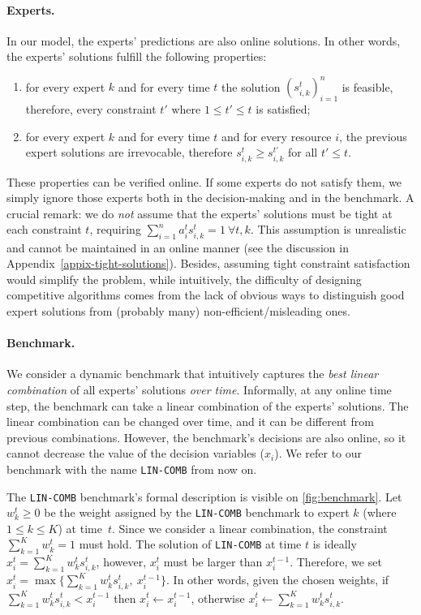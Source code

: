 \paragraph{Experts.} In our model, the experts' predictions are also online solutions. In other words, the experts' solutions
fulfill the following properties:
\begin{enumerate}
	\item for every expert $k$ and for every time $t$ the solution $(s_{i,k}^{t})_{i=1}^{n}$ is feasible, therefore, every constraint $t'$ where $1 \leq t' \leq t$ is satisfied;
	\item for every expert $k$ and for every time $t$ and for every resource $i$, the previous expert solutions are irrevocable, therefore $s_{i,k}^{t} \geq s_{i,k}^{t'}$ for all $t' \leq t$.
\end{enumerate}
These properties can be verified online. If some experts do not satisfy them, we simply ignore those experts both in the decision-making and in the benchmark.
A crucial remark: we do \emph{not} assume that the experts' solutions must be tight at each constraint $t$, requiring $\sum_{i=1}^{n} a_{i}^{t} s_{i,k}^{t} = 1 ~ \forall t, k$.
This assumption is unrealistic and cannot be maintained in an online manner (see the discussion in Appendix~\ref{appix-tight-solutions}).
Besides, assuming tight constraint satisfaction would simplify the problem, while intuitively,
the difficulty of designing competitive algorithms comes from the lack of obvious ways to distinguish
good expert solutions from (probably many) non-efficient/misleading ones.

\paragraph{Benchmark.}
We consider a dynamic benchmark that intuitively captures the \emph{best linear combination} of all experts' solutions \emph{over time}.
Informally, at any online time step, the benchmark can take a linear combination of the experts' solutions.
The linear combination can be changed over time, and it can be different from previous combinations.
However, the benchmark's decisions are also online, so it cannot decrease the value of the decision variables ($x_{i}$).
We refer to our benchmark with the name \texttt{LIN-COMB} from now on.

The \texttt{LIN-COMB} benchmark's formal description is visible on \cref{fig:benchmark}.
Let $w_{k}^{t} \geq 0$ be the weight assigned by the \texttt{LIN-COMB} benchmark to expert $k$ (where $1 \leq k \leq K$) at time~$t$.
Since we consider a linear combination, the constraint $ \sum_{k=1}^{K} w_{k}^{t} = 1$ must hold.
The solution of \texttt{LIN-COMB} at time $t$ is ideally $x_{i}^{t} = \sum_{k=1}^{K} w_{k}^{t} s_{i,k}^{t}$,
however, $x_{i}^{t}$ must be larger than $x_{i}^{t-1}$.
Therefore, we set $x_{i}^{t} = \max\bigl\{\sum_{k=1}^{K} w_{k}^{t} s_{i,k}^{t},\ x_{i}^{t-1}\bigr\}$.
In other words, given the chosen weights, if  $\sum_{k=1}^{K} w_{k}^{t} s_{i,k}^{t} < x_{i}^{t-1}$ then $x_{i}^{t} \gets x_{i}^{t-1}$,
otherwise $x_{i}^{t} \gets \sum_{k=1}^{K} w_{k}^{t} s_{i,k}^{t}$.

